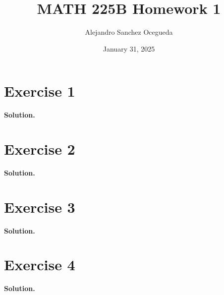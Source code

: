 \documentclass{article}
\title{MATH 225B Homework 1}
\author{Alejandro Sanchez Ocegueda}
\date{January 31, 2025}
\newcommand{\solution}{\noindent \textbf{Solution.}}
\begin{document}
\maketitle

\section*{Exercise 1}


\vspace{3mm}
\solution


\newpage
\section*{Exercise 2}

\vspace{3mm}
\solution


\newpage
\section*{Exercise 3}


\vspace{3mm}
\solution



\newpage
\section*{Exercise 4}


\vspace{3mm}
\solution
\end{document}
